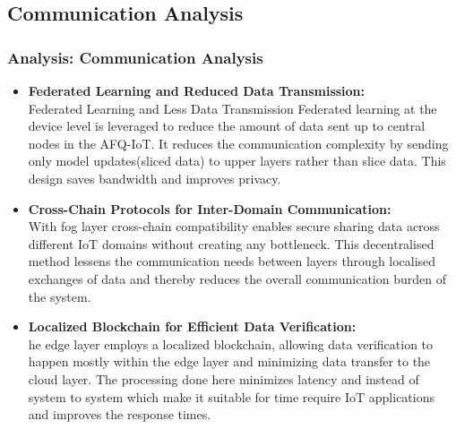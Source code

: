 \documentclass [xcolor=svgnames] {beamer}
\begin{document}
\begin{frame}
\footnotesize
\subsection{Communication Analysis}
\frametitle{Analysis: Communication Analysis}

\begin{itemize}
\item \textbf{Federated Learning and Reduced Data Transmission: }\\
Federated Learning and Less Data Transmission Federated learning at the device level is leveraged to reduce the amount of data sent up to central nodes in the AFQ-IoT. It reduces the communication complexity by sending only model updates(sliced data) to upper layers rather than slice data. This design saves bandwidth and improves privacy.

\item \textbf{Cross-Chain Protocols for Inter-Domain Communication: }\\
With fog layer cross-chain compatibility enables secure sharing data across different IoT domains without creating any bottleneck. This decentralised method lessens the communication needs between layers through localised exchanges of data and thereby reduces the overall communication burden of the system.

\item \textbf{Localized Blockchain for Efficient Data Verification: }\\
he edge layer employs a localized blockchain, allowing data verification to happen mostly within the edge layer and minimizing data transfer to the cloud layer. The processing done here minimizes latency and instead of system to system which make it suitable for time require IoT applications and improves the response times.

\end{itemize}

\end{frame}
\end{document}
